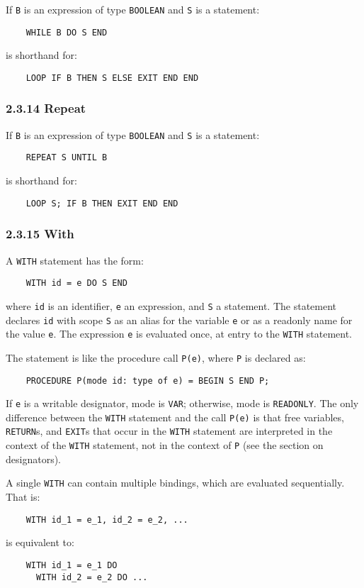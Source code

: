 \documentclass[10pt]{article}
\begin{document}
If \verb|B| is an expression of type \verb|BOOLEAN| and \verb|S| is a statement:
\begin{verbatim}
    WHILE B DO S END
\end{verbatim}
is shorthand for:
\begin{verbatim}
    LOOP IF B THEN S ELSE EXIT END END
\end{verbatim}

\subsubsection*{2.3.14 Repeat}

If \verb|B| is an expression of type \verb|BOOLEAN| and \verb|S| is a
statement:
\begin{verbatim}
    REPEAT S UNTIL B
\end{verbatim}
is shorthand for:
\begin{verbatim}
    LOOP S; IF B THEN EXIT END END
\end{verbatim}

\subsubsection*{2.3.15 With}

A \verb|WITH| statement has the form:
\begin{verbatim}
    WITH id = e DO S END
\end{verbatim}
where \verb|id| is an identifier, \verb|e| an expression, and \verb|S| a
statement.  The statement declares \verb|id| with scope \verb|S| as an alias
for the variable \verb|e| or as a readonly name for the value \verb|e|.  The
expression \verb|e| is evaluated once, at entry to the \verb|WITH| statement.

The statement is like the procedure call \verb|P(e)|, where \verb|P| is
declared as:
\begin{verbatim}
    PROCEDURE P(mode id: type of e) = BEGIN S END P;
\end{verbatim}
If \verb|e| is a writable designator, mode is \verb|VAR|; otherwise, mode is
\verb|READONLY|.  The only difference between the \verb|WITH| statement and
the call \verb|P(e)| is that free variables, \verb|RETURN|s, and \verb|EXIT|s
that occur in the \verb|WITH| statement are interpreted in the context of the
\verb|WITH| statement, not in the context of \verb|P| (see the section on
designators).

A single \verb|WITH| can contain multiple bindings, which are evaluated
sequentially.  That is:
\begin{verbatim}
    WITH id_1 = e_1, id_2 = e_2, ...
\end{verbatim}
is equivalent to:
\begin{verbatim}
    WITH id_1 = e_1 DO
      WITH id_2 = e_2 DO ...
\end{verbatim}
\end{document}
